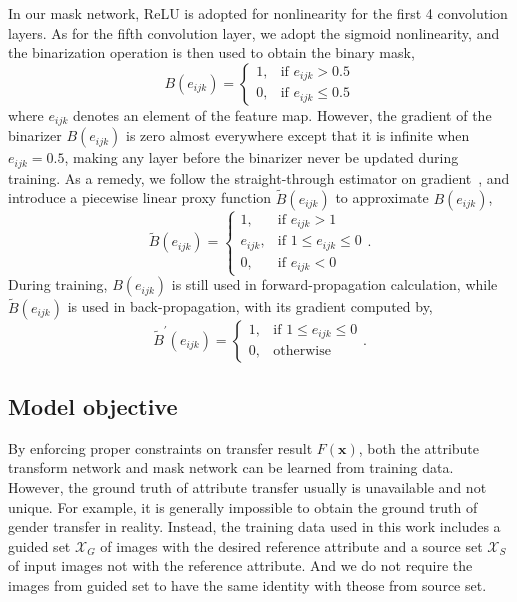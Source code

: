 \documentclass[journal]{IEEEtran}
\begin{document}
In our mask network, ReLU is adopted for nonlinearity for the first 4 convolution layers.
As for the fifth convolution layer, we adopt the sigmoid nonlinearity, and the binarization operation is then used to obtain the binary mask,
\begin{equation}
\label{eqn:binarization}
B(e_{ijk}) = \begin{cases}
1, & \mbox{if } e_{ijk} > 0.5\\
0, & \mbox{if } e_{ijk} \leq 0.5
\end{cases}
\end{equation}
where $e_{ijk}$ denotes an element of the feature map.
However, the gradient of the binarizer $B(e_{ijk})$ is zero almost everywhere except that it is infinite when $e_{ijk} = 0.5$,
making any layer before the binarizer never be updated during training.
As a remedy, we follow the straight-through estimator on gradient~\cite{courbariaux2016binarized}, and introduce a piecewise linear proxy function $\tilde{B}(e_{ijk})$ to approximate $B(e_{ijk})$,
\begin{equation}
\label{eqn:approx_bin}
\tilde{B}(e_{ijk})=\begin{cases}
1, & \mbox{if } e_{ijk} > 1\\
e_{ijk}, & \mbox{if }  1\leq e_{ijk} \leq 0 \\
0, & \mbox{if }  e_{ijk} < 0
\end{cases}.
\end{equation}
During training, $B(e_{ijk})$ is still used in forward-propagation calculation, while $\tilde{B}(e_{ijk})$ is used in back-propagation, with its gradient computed by,
\begin{equation}
\label{eqn:grad_bin}
\tilde{B}^\prime(e_{ijk})=\begin{cases}
1, & \mbox{if } 1\leq e_{ijk}\leq 0 \\
0, & \mbox{otherwise}
\end{cases}.
\end{equation}


\subsection{Model objective}\label{s2_1_1}
By enforcing proper constraints on transfer result $F(\mathbf{x})$, both the attribute transform network and mask network can be learned from training data.
However, the ground truth of attribute transfer usually is unavailable and not unique.
For example, it is generally impossible to obtain the ground truth of gender transfer in reality.
Instead, the training data used in this work includes a guided set $\mathcal{X}_G$ of images with the desired reference attribute and a source set $\mathcal{X}_S$ of input images not with the reference attribute.
And we do not require the images from guided set to have the same identity with theose from source set.
\end{document}
